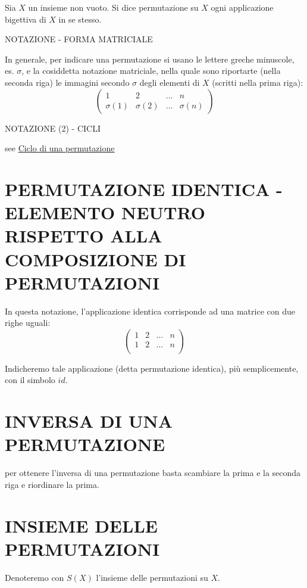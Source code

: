 \begin{definizione}
Sia $X$ un insieme non vuoto. Si dice permutazione su $X$ ogni applicazione bigettiva di $X$ in se stesso. \cite{permutazione1}
\end{definizione}

\begin{osservazione}
NOTAZIONE - FORMA MATRICIALE

In generale, per indicare una permutazione si usano le lettere greche minuscole, es. $\sigma$, e la cosiddetta notazione matriciale,
nella quale sono riportarte (nella seconda riga) le immagini secondo $\sigma$ degli elementi di $X$ (scritti nella prima riga):
\[
\left(
 \begin{array}{cccc}
  1 & 2 & ... & n \\
  \sigma(1) & \sigma(2) & ... & \sigma(n)
 \end{array}
\right)
\] 

\end{osservazione}

\begin{osservazione}
 NOTAZIONE (2) - CICLI
 
see \href{./PermutazioneCicli.html}{Ciclo di una permutazione}
\end{osservazione}


\section{PERMUTAZIONE IDENTICA - ELEMENTO NEUTRO RISPETTO ALLA COMPOSIZIONE DI PERMUTAZIONI}
In questa notazione, l'applicazione identica corrisponde ad una matrice con due righe uguali:
\[
\left(
 \begin{array}{cccc}
  1 & 2 & ... & n \\
  1 & 2 & ... & n \\
 \end{array}
\right)
\]

Indicheremo tale applicazione (detta permutazione identica), più semplicemente, con il simbolo $id$. \cite{permutazione1}

\section{INVERSA DI UNA PERMUTAZIONE}
per ottenere l’inversa di una permutazione basta scambiare la prima e la seconda riga e riordinare la prima. \cite{permutazione2}

\section{INSIEME DELLE PERMUTAZIONI}
Denoteremo con $S(X)$ l'insieme delle permutazioni su $X$. \cite{permutazione1}

